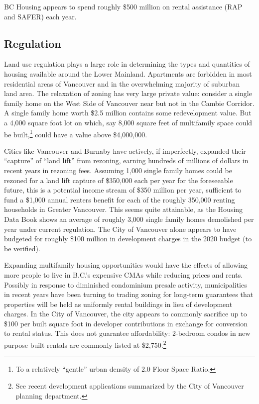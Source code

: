 \documentclass[12pt]{article}
\begin{document}
BC Housing appears to spend roughly \$500 million on rental assistance (RAP and SAFER) each year.

\subsection{Regulation}

Land use regulation plays a large role in determining the types and quantities of housing available around the Lower Mainland. Apartments are forbidden in most residential areas of Vancouver and in the overwhelming majority of suburban land area. The relaxation of zoning has very large private value: consider a single family home on the West Side of Vancouver near but not in the Cambie Corridor. A single family home worth \$2.5 million contains some redevelopment value. But a 4,000 square foot lot on which, say 8,000 square feet of multifamily space could be built,\footnote{To a relatively ``gentle'' urban density of 2.0 Floor Space Ratio.} could have a value above \$4,000,000. 

Cities like Vancouver and Burnaby have actively, if imperfectly, expanded their ``capture'' of ``land lift'' from rezoning, earning hundreds of millions of dollars in recent years in rezoning fees. Assuming 1,000 single family homes could be rezoned for a land lift capture of \$350,000 each per year for the foreseeable future, this is a potential income stream of \$350 million per year, sufficient to fund a \$1,000 annual renters benefit for each of the roughly 350,000 renting households in Greater Vancouver. This seems quite attainable, as the Housing Data Book shows an average of roughly 3,000 single family homes demolished per year under current regulation. The City of Vancouver alone appears to have budgeted for roughly \$100 million in development charges in the 2020 budget (to be verified).

Expanding multifamily housing opportunities would have the effects of allowing more people to live in B.C.'s expensive CMAs while reducing prices and rents. 
Possibly in response to diminished condominium presale activity, municipalities in recent years have been turning to trading zoning for long-term guarantees that properties will be held as uniformly rental buildings in lieu of development charges. In the City of Vancouver, the city appears to commonly sacrifice up to \$100 per built square foot in developer contributions in exchange for conversion to rental status. This does not guarantee affordability: 2-bedroom condos in new purpose built rentals are commonly listed at \$2,750.\footnote{See recent development applications summarized by the City of Vancouver planning department.}
\end{document}
